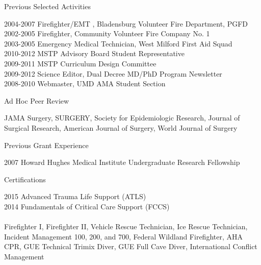 \documentclass{resume} %
\begin{document}

\begin{rSection}{Previous Selected Activities}

   2004-2007 \enspace Firefighter/EMT , Bladensburg Volunteer Fire Department, PGFD\\
   2002-2005 \enspace Firefighter, Community Volunteer Fire Company No. 1\\
   2003-2005 \enspace Emergency Medical Technician, West Milford First Aid Squad	\\
   2010-2012 \enspace MSTP Advisory Board Student Representative \\
   2009-2011 \enspace MSTP Curriculum Design Committee	\\
   2009-2012 \enspace Science Editor, Dual Decree MD/PhD Program Newsletter         \\
   2008-2010 \enspace Webmaster, UMD AMA Student Section

   
   \end{rSection}
   
   
   
   \begin{rSection}{Ad Hoc Peer Review}
 
   JAMA Surgery, SURGERY, Society for Epidemiologic Research, Journal of Surgical Research, American Journal of Surgery, World Journal of Surgery
  
   
   \end{rSection}
   
 
   
   \begin{rSection}{Previous Grant Experience}
  
   2007 \enspace Howard Hughes Medical Institute Undergraduate Research Fellowship 
   
   
   \end{rSection}
   
   
   \begin{rSection}{Certifications}
  
   2015 \enspace Advanced Trauma Life Support (ATLS)\\
   2014 \enspace Fundamentals of Critical Care Support (FCCS) \\
   \\
   Firefighter I, Firefighter II, Vehicle Rescue Technician, Ice Rescue Technician, 
   Incident Management 100, 200, and 700, Federal Wildland Firefighter, AHA CPR,
   GUE Technical Trimix Diver, GUE Full Cave Diver, International Conflict Management
   
   
   \end{rSection}
   
\end{document}
